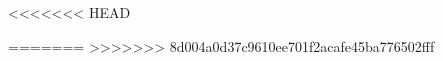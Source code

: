 \documentclass[12pt,twoside]{report}
\begin{document}

\newpage
{}

\newpage
\tableofcontents
\newpage
\listoffigures
\newpage
\pagestyle{fancy}
 \setcounter{page}{1}

\newpage
\pagestyle{fancy}

\newpage
\pagestyle{fancy}

\newpage
\pagestyle{fancy}

<<<<<<< HEAD
%
\newpage
\pagestyle{fancy}

\newpage
\pagestyle{fancy}

\newpage
\pagestyle{fancy}

=======
>>>>>>> 8d004a0d37c9610ee701f2acafe45ba776502fff
\newpage
\pagestyle{fancy}

%
%
\end{document}
